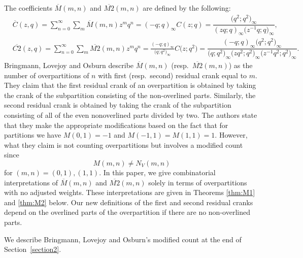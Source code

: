\documentclass[10pt,a4paper]{amsart}
\numberwithin{equation}{section}
\newcommand\thm[1]{\ref{thm:#1}}
\begin{document}
The coefficients $\overline{M}(m,n)$ and $\overline{M2}(m,n)$ are defined by the following:
\begin{align*}
&{}\overline{C}(z,q) = \sum_{n=0}^\infty \sum_m \overline{M}(m,n) z^m q^n=(-q;q)_{\infty}C(z;q)=\dfrac{\bigl(q^2;q^2\bigr)_{\infty}}{(zq;q)_{\infty}\bigl(z^{-1}q;q\bigr)_{\infty}},
\\
&{}\overline{C2}(z,q) = \sum_{n=0}^\infty \sum_m \overline{M2}(m,n) z^m q^n=\frac{(-q;q)_{\infty}}{\bigl(q;q^2\bigr)_{\infty}}C\bigl(z;q^2\bigr)=\dfrac{(-q;q)_{\infty}\bigl(q^2;q^2\bigr)_{\infty}}{\bigl(q;q^2\bigr)_{\infty}\bigl(zq^2;q^2\bigr)_{\infty}\bigl(z^{-1}q^2;q^2\bigr)_{\infty}}.
\end{align*}
Bringmann, Lovejoy and Osburn \cite{Br-Lo-Os} describe $\overline{M}(m,n)$ (resp.\ $\overline{M2}(m,n)$) as the number of overpartitions of $n$ with first (resp.\ second) residual crank equal to $m$. They claim that the first residual crank of an overpartition is obtained by taking the crank of the subpartition consisting of the non-overlined parts. Similarly, the second residual crank is obtained by taking the crank of the subpartition consisting of all of the even nonoverlined parts divided by two. The authors state that they make the appropriate modifications based on the fact that for partitions we have $M(0,1)=-1$ and $M(-1,1)=M(1,1)=1$. However, what they claim is not counting overpartitions but involves a modified count since
\begin{equation*}%
M(m,n)\neq N_V(m,n)
\end{equation*}%
for $(m,n)=(0,1),(1,1)$. In this paper, we give combinatorial interpretations of $\overline{M}(m,n)$ and $\overline{M2}(m,n)$ solely in terms of overpartitions with no adjusted weights. These interpretations are given in Theorems \thm{M1} and \thm{M2} below. Our new definitions of the first and second residual cranks depend on the overlined parts of the overpartition if there are no non-overlined parts.

We describe Bringmann, Lovejoy and Osburn's modified count at the end of Section~\ref{section2}.
\end{document}
